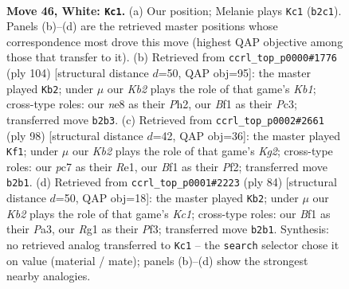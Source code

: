 \documentclass[11pt]{article}
\begin{document}
\clearpage

\begin{figure}[p]\centering
\begin{subfigure}{0.46\textwidth}\centering
\resizebox{\linewidth}{!}{%
\newchessgame
\chessboard[
  setfen={4n3/p1p5/2k2p2/8/r4P1R/8/rK1B3P/5BR1 w - - 1 46},
  showmover=false,
  pgfstyle=straightmove, color=movearrow, markmove={b2-c1}
]}
\caption{}
\end{subfigure}\hfill
\begin{subfigure}{0.46\textwidth}\centering
\resizebox{\linewidth}{!}{%
\newchessgame
\chessboard[
  setfen={R7/P2R4/1P4p1/5pk1/4p2p/r1P5/7P/rK6 w - - 1 53},
  showmover=false,
  pgfstyle=straightmove, color=movearrow, markmove={b1-b2}
]}
\caption{}
\end{subfigure}
\\[4pt]
\begin{subfigure}{0.46\textwidth}\centering
\resizebox{\linewidth}{!}{%
\newchessgame
\chessboard[
  setfen={8/4k3/r2p4/P1pPn1p1/4B1r1/R7/5PK1/4R3 w - - 5 50},
  showmover=false,
  pgfstyle=straightmove, color=movearrow, markmove={g2-f1}
]}
\caption{}
\end{subfigure}\hfill
\begin{subfigure}{0.46\textwidth}\centering
\resizebox{\linewidth}{!}{%
\newchessgame
\chessboard[
  setfen={2r5/8/p3pk1P/1pr5/7R/P2B1P2/2P5/2K5 w - - 2 43},
  showmover=false,
  pgfstyle=straightmove, color=movearrow, markmove={c1-b2}
]}
\caption{}
\end{subfigure}
\caption{\textbf{Move 46, White: \texttt{Kc1}.} (a) Our position; Melanie plays \texttt{Kc1} (\texttt{b2c1}). Panels (b)--(d) are the retrieved master positions whose correspondence most drove this move (highest QAP objective among those that transfer to it). (b) Retrieved from \texttt{ccrl\_top\_p0000\#1776} (ply 104) [structural distance $d$=50, QAP obj=95]: the master played \texttt{Kb2}; under $\mu$ our \emph{Kb2} plays the role of that game's \emph{Kb1}; cross-type roles: our \emph{n}e8 as their \emph{P}h2, our \emph{B}f1 as their \emph{P}c3; transferred move \texttt{b2b3}. (c) Retrieved from \texttt{ccrl\_top\_p0002\#2661} (ply 98) [structural distance $d$=42, QAP obj=36]: the master played \texttt{Kf1}; under $\mu$ our \emph{Kb2} plays the role of that game's \emph{Kg2}; cross-type roles: our \emph{p}c7 as their \emph{R}e1, our \emph{B}f1 as their \emph{P}f2; transferred move \texttt{b2b1}. (d) Retrieved from \texttt{ccrl\_top\_p0001\#2223} (ply 84) [structural distance $d$=50, QAP obj=18]: the master played \texttt{Kb2}; under $\mu$ our \emph{Kb2} plays the role of that game's \emph{Kc1}; cross-type roles: our \emph{B}f1 as their \emph{P}a3, our \emph{R}g1 as their \emph{P}f3; transferred move \texttt{b2b1}. Synthesis: no retrieved analog transferred to \texttt{Kc1} -- the \texttt{search} selector chose it on value (material / mate); panels (b)--(d) show the strongest nearby analogies.}
\label{fig:thought-m90}
\end{figure}
\end{document}
